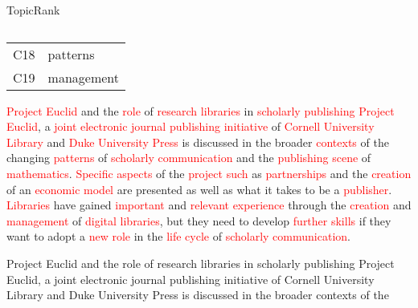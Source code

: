 \begin{frame}[label=topicrank]{TopicRank}
\begin{columns}
\begin{column}{.55\textwidth}
{{{{\begin{tabular}{cl}
                    C18 & patterns\\
                    C19 & management\\
                    \bottomrule
                  \end{tabular}
                }
              }
            }{ %
              \begin{exampleblock}{\footnotesize \textcolor{red}{Project Euclid}
                                   and the \textcolor{red}{role} of
                                   \textcolor{red}{research libraries} in
                                   \textcolor{red}{scholarly publishing}}
                \justifying
                \footnotesize \textcolor{red}{Project Euclid}, a
                \textcolor{red}{joint electronic journal publishing initiative}
                of \textcolor{red}{Cornell University Library} and
                \textcolor{red}{Duke University Press} is discussed in the
                broader \textcolor{red}{contexts} of the changing
                \textcolor{red}{patterns} of \textcolor{red}{scholarly
                communication} and the \textcolor{red}{publishing scene} of
                \textcolor{red}{mathematics}. \textcolor{red}{Specific aspects}
                of the \textcolor{red}{project such} as
                \textcolor{red}{partnerships} and the \textcolor{red}{creation}
                of an \textcolor{red}{economic model} are presented as well as
                what it takes to be a \textcolor{red}{publisher}.
                \textcolor{red}{Libraries} have gained
                \textcolor{red}{important} and \textcolor{red}{relevant
                experience} through the \textcolor{red}{creation} and
                \textcolor{red}{management} of \textcolor{red}{digital
                libraries}, but they need to develop \textcolor{red}{further
                skills} if they want to adopt a \textcolor{red}{new role} in the
                \textcolor{red}{life cycle} of \textcolor{red}{scholarly
                communication}.
              \end{exampleblock}
            }
          }{ %
            \begin{exampleblock}{\footnotesize Project Euclid and the role of
                                 research libraries in scholarly publishing}
              \justifying
              \footnotesize Project Euclid, a joint electronic journal
              publishing initiative of Cornell University Library and Duke
              University Press is discussed in the broader contexts of the

\end{exampleblock}}
\end{column}
\end{columns}
\end{frame}
